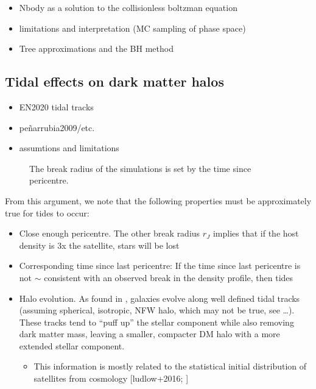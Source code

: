 \begin{itemize}
\tightlist
\item
  Nbody as a solution to the collisionless boltzman equation
\item
  limitations and interpretation (MC sampling of phase space)
\item
  Tree approximations and the BH method
\end{itemize}

\subsection{Tidal effects on dark matter
halos}\label{tidal-effects-on-dark-matter-halos}

\begin{itemize}
\tightlist
\item
  EN2020 tidal tracks
\item
  peñarrubia2009/etc.
\item
  assumtions and limitations
\end{itemize}

\begin{figure}
\centering
{}
\caption[Break radius validation]{The break radius of the simulations is
set by the time since pericentre.}\label{fig:idealized_break_radius}
\end{figure}

From this argument, we note that the following properties must be
approximately true for tides to occur:

\begin{itemize}
\tightlist
\item
  Close enough pericentre. The other break radius \(r_J\) implies that
  if the host density is 3x the satellite, stars will be lost
\item
  Corresponding time since last pericentre: If the time since last
  pericentre is not \(\sim\) consistent with an observed break in the
  density profile, then tides
\item
  Halo evolution. As found in \citet{EN2021}, galaxies evolve along well
  defined tidal tracks (assuming spherical, isotropic, NFW halo, which
  may not be true, see \ldots). These tracks tend to ``puff up'' the
  stellar component while also removing dark matter mass, leaving a
  smaller, compacter DM halo with a more extended stellar component.

  \begin{itemize}
  \tightlist
  \item
    This information is mostly related to the statistical initial
    distribution of satellites from cosmology {[}ludlow+2016;
    \citet{fattahi+2018}{]}
  \end{itemize}
\end{itemize}

